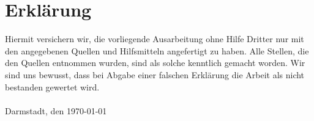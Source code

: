 \section*{Erklärung}

Hiermit versichern wir, die vorliegende Ausarbeitung ohne Hilfe Dritter nur mit den angegebenen Quellen und Hilfsmitteln angefertigt zu haben. Alle Stellen, die den Quellen entnommen wurden, sind als solche kenntlich gemacht worden. Wir sind uns bewusst, dass bei Abgabe einer falschen Erklärung die Arbeit als nicht bestanden gewertet wird. \\ \\

Darmstadt, den \today

%
%
%



